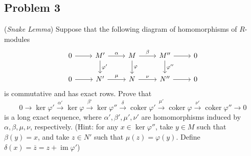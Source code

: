 \subsection*{Problem 3}
(\textit{Snake Lemma}) Suppose that the following diagram of homomorphisms of $R$-modules
\[\begin{tikzcd}
    0 \arrow[r] & M' \arrow[r, "\alpha"] \arrow[d, "\varphi'"] & M \arrow[r, "\beta"] \arrow[d, "\varphi"] & M'' \arrow[r] \arrow[d, "\varphi''"] & 0 \\
    0 \arrow[r] & N' \arrow[r, "\mu"] & N \arrow[r, "\nu"] & N'' \arrow[r] & 0
\end{tikzcd}\]
is commutative and has exact rows. Prove that
\[ 0 \to \ker\varphi' \xrightarrow{\alpha'} \ker\varphi \xrightarrow{\beta'} \ker\varphi'' \xrightarrow{\delta} \operatorname{coker}\varphi' \xrightarrow{\mu'} \operatorname{coker}\varphi \xrightarrow{\nu'} \operatorname{coker}\varphi'' \to 0 \]
is a long exact sequence, where $\alpha', \beta', \mu', \nu'$ are homomorphisms induced by $\alpha, \beta, \mu, \nu$, respectively. (Hint: for any $x \in \ker\varphi''$, take $y \in M$ such that $\beta(y) = x$, and take $z \in N'$ such that $\mu(z) = \varphi(y)$. Define $\delta(x) = \overline{z} = z + \operatorname{im}\varphi'$)
